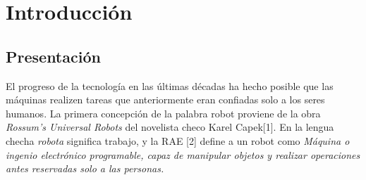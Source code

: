 

\chapter{Introducción}


\section{Presentación} %

El progreso de la tecnología en las últimas décadas ha hecho posible que las máquinas realizen tareas que anteriormente eran confiadas solo a los seres humanos. La primera concepción de la palabra robot proviene de la obra \textsl{Rossum’s Universal Robots} del novelista checo Karel Capek[1]. En la lengua checha \textsl{robota} significa trabajo, y la RAE [2] define a un robot como \textsl{Máquina o ingenio electrónico programable, capaz de manipular objetos y realizar operaciones antes reservadas solo a las personas.}
\\

